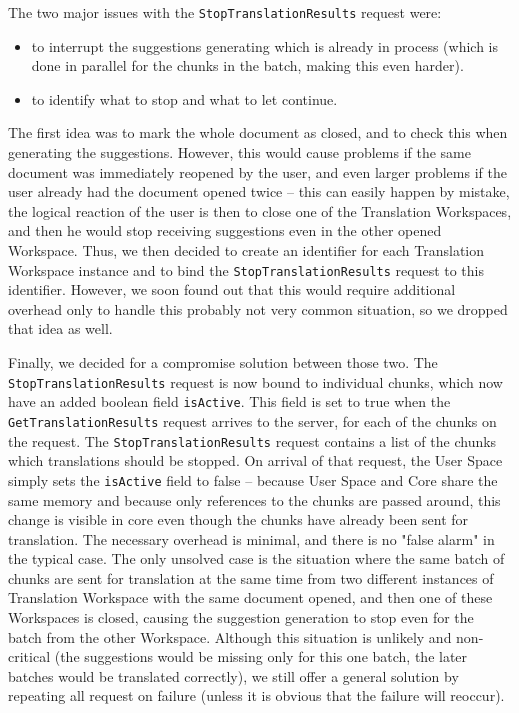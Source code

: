 {The two major issues with the {\tt StopTranslationResults} request were:

\begin{itemize}
	\item to interrupt the suggestions generating which is already in process (which is done in parallel for the chunks in the batch, making this even harder).
	\item to identify what to stop and what to let continue.
\end{itemize}

The first idea was to mark the whole document as closed, and to check this when generating the suggestions. However, this would cause problems if the same document was immediately reopened by the user, and even larger problems if the user already had the document opened twice -- this can easily happen by mistake, the logical reaction of the user is then to close one of the Translation Workspaces, and then he would stop receiving suggestions even in the other opened Workspace. Thus, we then decided to create an identifier for each Translation Workspace instance and to bind the {\tt StopTranslationResults} request to this identifier. However, we soon found out that this would require additional overhead only to handle this probably not very common situation, so we dropped that idea as well.

Finally, we decided for a compromise solution between those two. The {\tt StopTranslationResults} request is now bound to individual chunks, which now have an added boolean field {\tt isActive}. This field is set to true when the {\tt GetTranslationResults} request arrives to the server, for each of the chunks on the request. The {\tt StopTranslationResults} request contains a list of the chunks which translations should be stopped. On arrival of that request, the User Space simply sets the {\tt isActive} field to false -- because User Space and Core share the same memory and because only references to the chunks are passed around, this change is visible in core even though the chunks have already been sent for translation. The necessary overhead is minimal, and there is no "false alarm" in the typical case. The only unsolved case is the situation where the same batch of chunks are sent for translation at the same time from two different instances of Translation Workspace with the same document opened, and then one of these Workspaces is closed, causing the suggestion generation to stop even for the batch from the other Workspace. Although this situation is unlikely and non-critical (the suggestions would be missing only for this one batch, the later batches would be translated correctly), we still offer a general solution by repeating all request on failure (unless it is obvious that the failure will reoccur).

}
